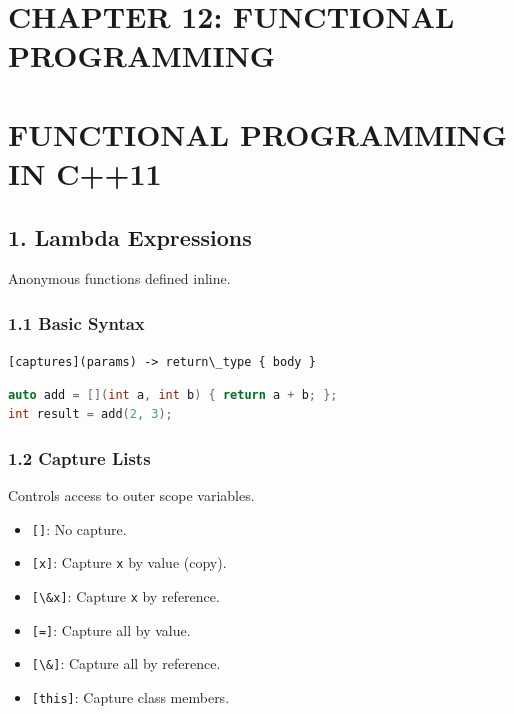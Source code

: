 \hypertarget{chapter-12-functional-programming}{%
\section{CHAPTER 12: FUNCTIONAL
PROGRAMMING}\label{chapter-12-functional-programming}}

\hypertarget{functional-programming-in-c11}{%
\section{FUNCTIONAL PROGRAMMING IN
C++11}\label{functional-programming-in-c11}}

\hypertarget{lambda-expressions}{%
\subsection{1. Lambda Expressions}\label{lambda-expressions}}

Anonymous functions defined inline.

\hypertarget{basic-syntax}{%
\subsubsection{1.1 Basic Syntax}\label{basic-syntax}}

\passthrough{\lstinline![captures](params) -> return\_type \{ body \}!}

\begin{lstlisting}[language={C++}]
auto add = [](int a, int b) { return a + b; };
int result = add(2, 3);
\end{lstlisting}

\hypertarget{capture-lists}{%
\subsubsection{1.2 Capture Lists}\label{capture-lists}}

Controls access to outer scope variables.

\begin{itemize}
\tightlist
\item
  \passthrough{\lstinline![]!}: No capture.
\item
  \passthrough{\lstinline![x]!}: Capture \passthrough{\lstinline!x!} by
  value (copy).
\item
  \passthrough{\lstinline![\&x]!}: Capture \passthrough{\lstinline!x!}
  by reference.
\item
  \passthrough{\lstinline![=]!}: Capture all by value.
\item
  \passthrough{\lstinline![\&]!}: Capture all by reference.
\item
  \passthrough{\lstinline![this]!}: Capture class members.
\end{itemize}

